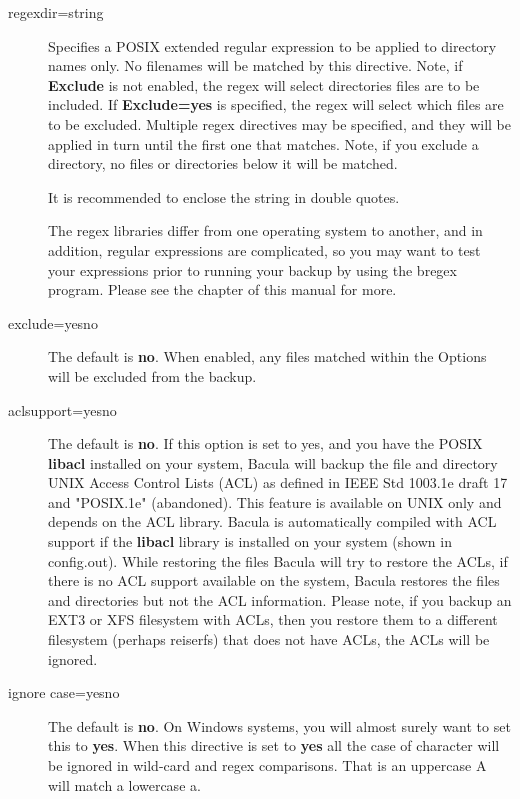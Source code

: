 \begin{description}
\item [regexdir=\lt{}string\gt{}]
   Specifies a POSIX extended regular expression to be applied to directory
   names only.  No filenames will be matched by this directive.  Note, if
   {\bf Exclude} is not enabled, the regex will select directories
   files are to be included.  If {\bf Exclude=yes} is specified, the
   regex will select which files are to be excluded.  Multiple
   regex directives may be specified, and they will be applied in turn
   until the first one that matches.  Note, if you exclude a directory, no
   files or directories below it will be matched.

   It is recommended to enclose the string in double quotes.

   The regex libraries differ from one operating system to
   another, and in addition, regular expressions are complicated,
   so you may want to test your expressions prior to running your
   backup by using the bregex program. Please see the
    chapter of this manual for
   more.


\item [exclude=yes\vb{}no]
   The default is {\bf no}.  When enabled, any files matched within the
   Options will be excluded from the backup.

\label{ACLSupport}
\item [aclsupport=yes\vb{}no]
   The default is {\bf no}.  If this option is set to yes, and you have the
   POSIX {\bf libacl} installed on your system, Bacula will backup the file
   and directory UNIX Access Control Lists (ACL) as defined in IEEE Std
   1003.1e draft 17 and "POSIX.1e" (abandoned).  This feature is
   available on UNIX only and depends on the ACL library.  Bacula is
   automatically compiled with ACL support if the {\bf libacl} library is
   installed on your system (shown in config.out).  While restoring the
   files Bacula will try to restore the ACLs, if there is no ACL support
   available on the system, Bacula restores the files and directories but
   not the ACL information.  Please note, if you backup an EXT3 or XFS
   filesystem with ACLs, then you restore them to a different filesystem
   (perhaps reiserfs) that does not have ACLs, the ACLs will be ignored.

\item [ignore case=yes\vb{}no]
   The default is {\bf no}.  On Windows systems, you will almost surely
   want to set this to {\bf yes}.  When this directive is set to {\bf yes}
   all the case of character will be ignored in wild-card and regex
   comparisons.  That is an uppercase A will match a lowercase a.


\end{description}
